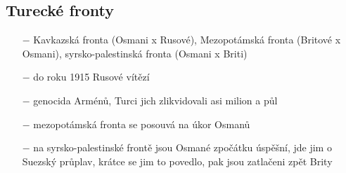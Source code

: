\documentclass{article}
\begin{document}
\subsection*{Turecké fronty}
\begin{itemize}
    \vspace{-0.5em}
    \setlength\itemsep{0.15em}
    \item[$-$] Kavkazská fronta (Osmani x Rusové), Mezopotámská fronta (Britové x Osmani), syrsko-palestinská fronta (Osmani x Briti)
    \item[$-$] do roku 1915 Rusové vítězí
    \item[$-$] genocida Arménů, Turci jich zlikvidovali asi milion a půl
    \item[$-$] mezopotámská fronta se posouvá na úkor Osmanů
    \item[$-$] na syrsko-palestinské frontě jsou Osmané zpočátku úspěšní, jde jim o Suezský průplav, krátce se jim to povedlo, pak jsou zatlačeni zpět Brity
\end{itemize}
\end{document}
